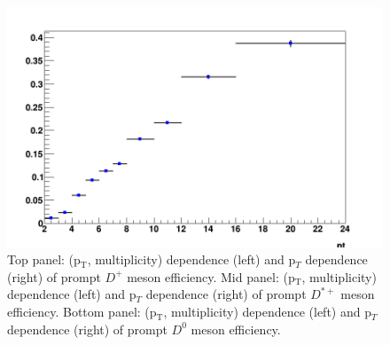 \begin{figure}[!htp]
	\includegraphics[width=.48\linewidth]{figures/Effs/EfficiencyMap_1D_Dzero_c_Ref_wLimAcc_Plot.png}  %
	
\caption{Top panel: (p$_\mathrm{T}$, multiplicity) dependence (left) and p$_T$ dependence (right) of prompt $D^{+}$ meson efficiency.
Mid panel: (p$_\mathrm{T}$, multiplicity) dependence (left) and p$_T$ dependence (right) of prompt $D^{*+}$ meson efficiency.
Bottom panel: (p$_\mathrm{T}$, multiplicity) dependence (left) and p$_T$ dependence (right) of prompt $D^{0}$ meson efficiency.
}
	\label{fig:dEffPrompt}	
\end{figure}

